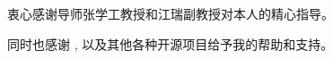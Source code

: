 ﻿%

\begin{ack}
	衷心感谢导师张学工教授和江瑞副教授对本人的精心指导。 
	
	同时也感谢 \href{https://github.com/xueruini/thuthesis}{\thuthesis}, 
	以及其他各种开源项目给予我的帮助和支持。 
\end{ack}
